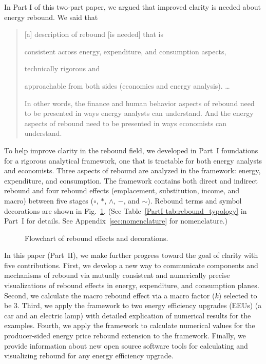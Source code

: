 \documentclass[12pt]{article}\usepackage[]{graphicx}\usepackage[]{xcolor}
\begin{document}
In Part I of this two-part paper, we argued that improved clarity is needed
about energy rebound.
We said that
%
\begin{quote}
  [a] description of rebound [is needed] that is
  \begin{enumerate*}[label={(\roman*)}]

    \item consistent across energy, expenditure, and consumption aspects,

    \item technically rigorous and

    \item approachable from both sides
          (economics and energy analysis). \ldots

  \end{enumerate*}
  In other words,
  the finance and human behavior aspects of rebound need to be presented
  in ways energy analysts can understand.
  And the energy aspects of rebound need to be presented
  in ways economists can understand.
\end{quote}

To help improve clarity in the rebound field,
we developed in Part~I foundations for
a rigorous analytical framework,
one that is tractable for both energy analysts and economists.
Three aspects of rebound are analyzed in the framework:
energy, expenditure, and consumption.
The framework contains both
direct and indirect rebound and
four rebound effects
(emplacement, substitution, income, and macro)
between five stages ($\circ$, $*$, $\wedge$, $-$, and $\sim$).
Rebound terms and symbol decorations are
shown in Fig.~\ref{fig:flowchart}.
(See Table~\ref{PartI-tab:rebound_typology} in Part~I for details.
See Appendix~\ref{sec:nomenclature} for nomenclature.)

\begin{figure}
\centering
  
\caption{Flowchart of rebound effects and decorations.}
\label{fig:flowchart}
\end{figure}

In this paper (Part~II), we make further progress toward the goal of clarity
with five contributions.
First, we develop a new way to communicate
components and mechanisms of rebound
via mutually consistent and numerically precise
visualizations of rebound effects
in energy, expenditure, and consumption planes.
Second, we calculate the macro rebound effect
via a macro factor ($k$) selected to be 3.
Third, we apply the framework to two energy efficiency upgrades (EEUs)
(a car and an electric lamp)
with detailed explication
of numerical results for the examples.
Fourth, we apply the framework to
calculate numerical values
for the producer-sided energy price rebound
extension to the framework.
Finally, we provide information
about new open source software tools
for calculating and visualizing rebound
for any energy efficiency upgrade.
\end{document}
